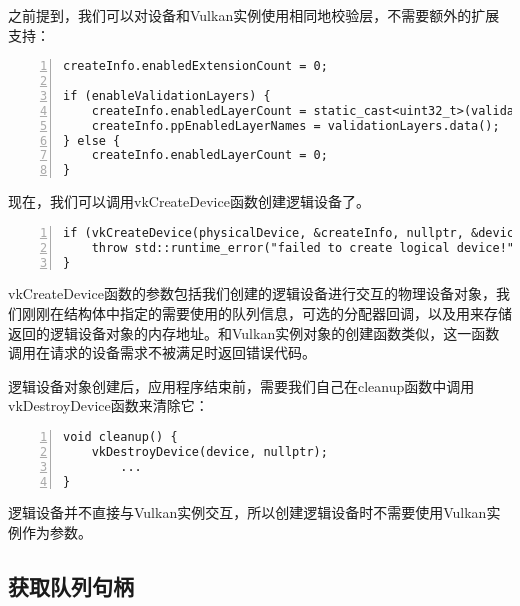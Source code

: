 \documentclass{ctexart}
\begin{document}
之前提到，我们可以对设备和Vulkan实例使用相同地校验层，不需要额外的扩展支持：

\begin{lstlisting}[language={[ANSI]C},keywordstyle=\color{blue!70},commentstyle=\color{red!50!green!50!blue!50},frame=shadowbox, rulesepcolor=\color{red!20!green!20!blue!20},basicstyle=\small,numbers=left, numberstyle=\tiny,breaklines=true]
createInfo.enabledExtensionCount = 0;

if (enableValidationLayers) {
	createInfo.enabledLayerCount = static_cast<uint32_t>(validationLayers.size());
	createInfo.ppEnabledLayerNames = validationLayers.data();
} else {
	createInfo.enabledLayerCount = 0;
}
\end{lstlisting}

现在，我们可以调用vkCreateDevice函数创建逻辑设备了。

\begin{lstlisting}[language={[ANSI]C},keywordstyle=\color{blue!70},commentstyle=\color{red!50!green!50!blue!50},frame=shadowbox, rulesepcolor=\color{red!20!green!20!blue!20},basicstyle=\small,numbers=left, numberstyle=\tiny,breaklines=true]
if (vkCreateDevice(physicalDevice, &createInfo, nullptr, &device) != VK_SUCCESS) {
	throw std::runtime_error("failed to create logical device!");
}
\end{lstlisting}

vkCreateDevice函数的参数包括我们创建的逻辑设备进行交互的物理设备对象，我们刚刚在结构体中指定的需要使用的队列信息，可选的分配器回调，以及用来存储返回的逻辑设备对象的内存地址。和Vulkan实例对象的创建函数类似，这一函数调用在请求的设备需求不被满足时返回错误代码。

逻辑设备对象创建后，应用程序结束前，需要我们自己在cleanup函数中调用vkDestroyDevice函数来清除它：

\begin{lstlisting}[language={[ANSI]C},keywordstyle=\color{blue!70},commentstyle=\color{red!50!green!50!blue!50},frame=shadowbox, rulesepcolor=\color{red!20!green!20!blue!20},basicstyle=\small,numbers=left, numberstyle=\tiny,breaklines=true]
void cleanup() {
	vkDestroyDevice(device, nullptr);
		...
}
\end{lstlisting}

逻辑设备并不直接与Vulkan实例交互，所以创建逻辑设备时不需要使用Vulkan实例作为参数。

\subsection{获取队列句柄}
\end{document}
